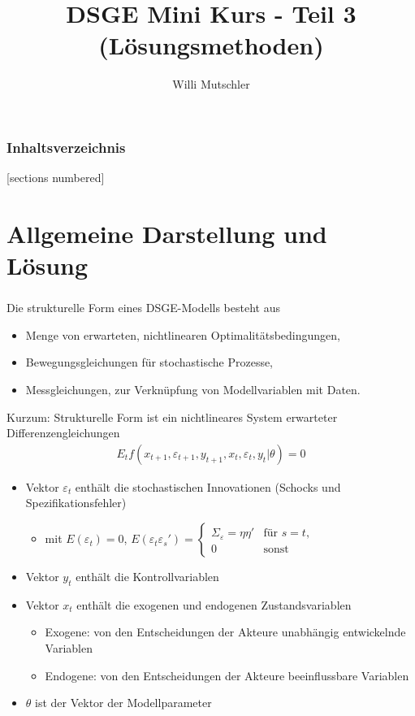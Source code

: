 \documentclass[10pt]{beamer}  %
\title{DSGE Mini Kurs - Teil 3 (L\"{o}sungsmethoden)}
\author{Willi Mutschler}
\begin{document}
\begin{frame}
    \titlepage
\end{frame}

\begin{frame}\frametitle{Inhaltsverzeichnis}
[sections numbered]
    \tableofcontents
\end{frame}

\section{Allgemeine Darstellung und L\"{o}sung}
\begin{frame}\frametitle{}\framesubtitle{}\small
Die strukturelle Form eines DSGE-Modells besteht aus
\begin{itemize}
\item Menge von erwarteten, nichtlinearen Optimalit\"{a}tsbedingungen,
\item Bewegungsgleichungen f\"{u}r stochastische Prozesse,
\item Messgleichungen, zur Verkn\"{u}pfung von Modellvariablen mit Daten.
\end{itemize}
Kurzum: Strukturelle Form ist ein nichtlineares System erwarteter Differenzengleichungen
\begin{align}
 E_t f(x_{t+1},\varepsilon_{t+1},y_{t+1},x_t,\varepsilon_t,y_t|\theta) = 0 \label{eq:model}
\end{align}
\begin{itemize}
\item Vektor $\varepsilon_t$ enth\"{a}lt die stochastischen Innovationen (Schocks und Spezifikationsfehler)
\begin{itemize}
  \item mit $E(\varepsilon_t) = 0$, $E(\varepsilon_t \varepsilon_s') = \begin{cases} \Sigma_\varepsilon = \eta \eta' & \text{f\"{u}r } s=t,\\
                                               0    & \text{sonst}
                                 \end{cases}$
\end{itemize}
\item Vektor $y_t$ enth\"{a}lt die Kontrollvariablen
\item Vektor $x_t$ enth\"{a}lt die exogenen und endogenen Zustandsvariablen
\begin{itemize}\footnotesize
\item Exogene: von den Entscheidungen der Akteure unabh\"{a}ngig entwickelnde Variablen
\item Endogene: von den Entscheidungen der Akteure beeinflussbare Variablen
\end{itemize}
\item $\theta$ ist der Vektor der Modellparameter
\end{itemize}
\end{frame}
\end{document}
